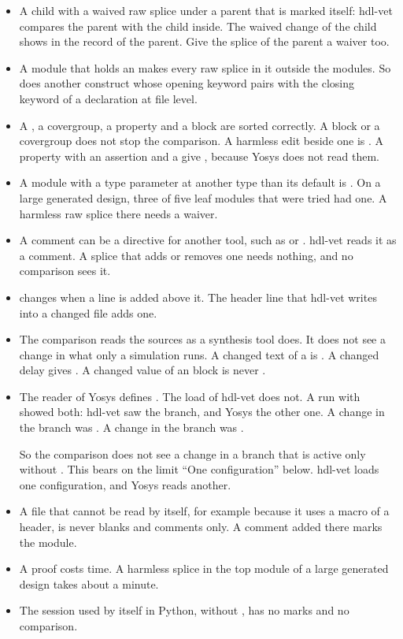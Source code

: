 \begin{itemize}
\begin{itemize}
    module that is compared.
  \item A child with a waived raw splice under a parent that is marked itself: hdl-vet compares
    the parent with the child inside. The waived change of the child shows in the record of
    the parent. Give the splice of the parent a waiver too.
  \item A module that holds an  makes every raw splice in it outside the
    modules. So does another construct whose opening keyword pairs with the closing keyword
    of a declaration at file level.
  \item A , a covergroup, a property and a  block are sorted
    correctly. A  block or a covergroup does not stop the comparison. A
    harmless edit beside one is . A property with an assertion and a
     give , because Yosys does not read them.
  \item A module with a type parameter at another type than its default is .
    On a large generated design, three of five leaf modules that were tried had one. A
    harmless raw splice there needs a waiver.
  \item A comment can be a directive for another tool, such as  or . hdl-vet reads it as a comment. A splice
    that adds or removes one needs nothing, and no comparison sees it.
  \item {} changes when a line is added above it. The header line that hdl-vet
    writes into a changed file adds one.
  \item The comparison reads the sources as a synthesis tool does. It does not see a change
    in what only a simulation runs. A changed text of a  is .
    A changed delay gives . A changed value of an  block is
    never .
  \item The reader of Yosys defines . The load of hdl-vet does not. A run
    with  showed both: hdl-vet saw the  branch, and
    Yosys the other one. A change in the  branch was . A change in
    the  branch was .

    So the comparison does not see a change in a branch that is active only without
    . This bears on the limit ``One configuration'' below. hdl-vet loads one
    configuration, and Yosys reads another.
  \item A file that cannot be read by itself, for example because it uses a macro of a
    header, is never blanks and comments only. A comment added there marks the module.
  \item A proof costs time. A harmless splice in the top module of a large generated design
    takes about a minute.
  \item The session used by itself in Python, without , has no marks and no
    comparison.
  \end{itemize}


\end{itemize}
